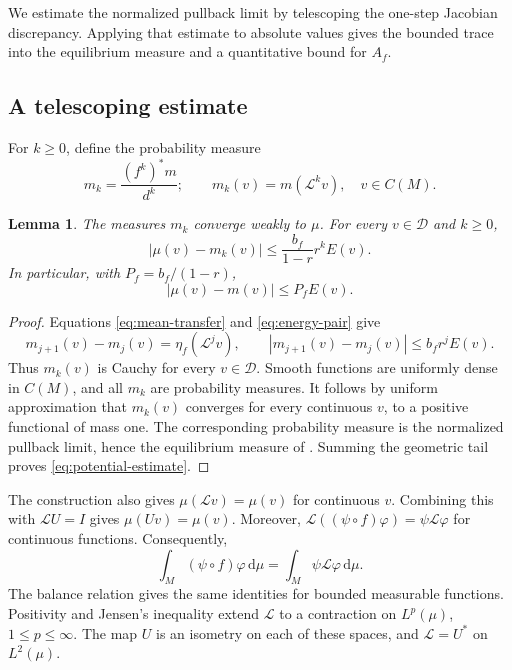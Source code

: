 \documentclass[10pt,a4paper]{amsart}
\newtheorem{lemma}[theorem]{Lemma}
\newcommand{\Lop}{\mathcal L}
\newcommand{\Dcal}{\mathcal D}
\newcommand{\dd}{\mathrm d}
\numberwithin{equation}{section}
\begin{document}
We estimate the normalized pullback limit by telescoping the one-step Jacobian discrepancy. Applying that estimate to absolute values gives the bounded trace into the equilibrium measure and a quantitative bound for $A_f$.

\subsection{A telescoping estimate}

For $k\ge0$, define the probability measure
\[
 m_k=\frac{(f^k)^*m}{d^k};
 \qquad m_k(v)=m(\Lop^kv),\quad v\in C(M).
\]

\begin{lemma}\label{lem:telescoping}
The measures $m_k$ converge weakly to $\mu$. For every $v\in\Dcal$ and $k\ge0$,
\begin{equation}\label{eq:potential-estimate}
 |\mu(v)-m_k(v)|\le\frac{b_f}{1-r}r^kE(v).
\end{equation}
In particular, with $P_f=b_f/(1-r)$,
\begin{equation}\label{eq:potential-zero}
 |\mu(v)-m(v)|\le P_fE(v).
\end{equation}
\end{lemma}

\begin{proof}
Equations \eqref{eq:mean-transfer} and \eqref{eq:energy-pair} give
\[
 m_{j+1}(v)-m_j(v)=\eta_f(\Lop^jv),
 \qquad |m_{j+1}(v)-m_j(v)|\le b_fr^jE(v).
\]
Thus $m_k(v)$ is Cauchy for every $v\in\Dcal$. Smooth functions are uniformly dense in $C(M)$, and all $m_k$ are probability measures. It follows by uniform approximation that $m_k(v)$ converges for every continuous $v$, to a positive functional of mass one. The corresponding probability measure is the normalized pullback limit, hence the equilibrium measure of \cite{OP14}. Summing the geometric tail proves \eqref{eq:potential-estimate}.
\end{proof}

The construction also gives $\mu(\Lop v)=\mu(v)$ for continuous $v$. Combining this with $\Lop U=I$ gives $\mu(Uv)=\mu(v)$. Moreover, $\Lop((\psi\circ f)\varphi)=\psi\Lop\varphi$ for continuous functions. Consequently,
\begin{equation}\label{eq:duality}
 \int_M(\psi\circ f)\varphi\,\dd\mu
 =\int_M\psi\Lop\varphi\,\dd\mu.
\end{equation}
The balance relation gives the same identities for bounded measurable functions. Positivity and Jensen's inequality extend $\Lop$ to a contraction on $L^p(\mu)$, $1\le p\le\infty$. The map $U$ is an isometry on each of these spaces, and $\Lop=U^*$ on $L^2(\mu)$.
\end{document}
